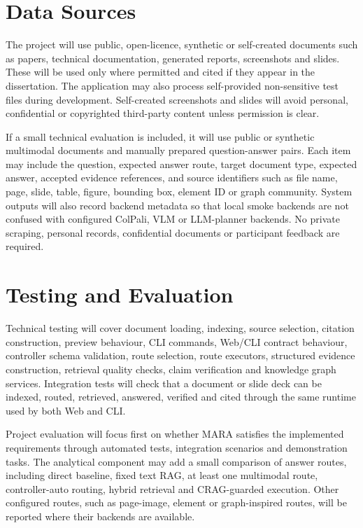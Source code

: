 \documentclass{article}
\begin{document}
\section{Data Sources}

The project will use public, open-licence, synthetic or self-created documents such as papers, technical documentation, generated reports, screenshots and slides. These will be used only where permitted and cited if they appear in the dissertation. The application may also process self-provided non-sensitive test files during development. Self-created screenshots and slides will avoid personal, confidential or copyrighted third-party content unless permission is clear.

If a small technical evaluation is included, it will use public or synthetic multimodal documents and manually prepared question-answer pairs. Each item may include the question, expected answer route, target document type, expected answer, accepted evidence references, and source identifiers such as file name, page, slide, table, figure, bounding box, element ID or graph community. System outputs will also record backend metadata so that local smoke backends are not confused with configured ColPali, VLM or LLM-planner backends. No private scraping, personal records, confidential documents or participant feedback are required.

\section{Testing and Evaluation}

Technical testing will cover document loading, indexing, source selection, citation construction, preview behaviour, CLI commands, Web/CLI contract behaviour, controller schema validation, route selection, route executors, structured evidence construction, retrieval quality checks, claim verification and knowledge graph services. Integration tests will check that a document or slide deck can be indexed, routed, retrieved, answered, verified and cited through the same runtime used by both Web and CLI.

Project evaluation will focus first on whether MARA satisfies the implemented requirements through automated tests, integration scenarios and demonstration tasks. The analytical component may add a small comparison of answer routes, including direct baseline, fixed text RAG, at least one multimodal route, controller-auto routing, hybrid retrieval and CRAG-guarded execution. Other configured routes, such as page-image, element or graph-inspired routes, will be reported where their backends are available.
\end{document}
